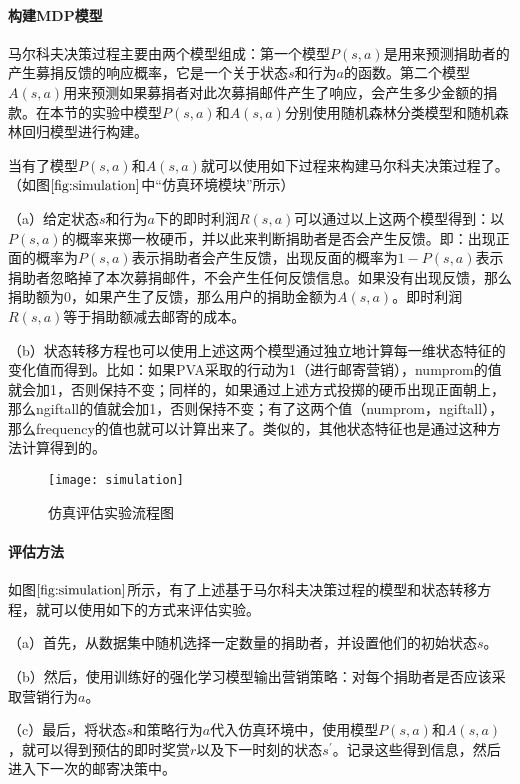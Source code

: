 \paragraph{构建MDP模型}
马尔科夫决策过程主要由两个模型组成：第一个模型$P(s,a)$是用来预测捐助者的产生募捐反馈的响应概率，它是一个关于状态$s$和行为$a$的函数。第二个模型$A(s,a)$用来预测如果募捐者对此次募捐邮件产生了响应，会产生多少金额的捐款。在本节的实验中模型$P(s,a)$和$A(s,a)$分别使用随机森林分类模型和随机森林回归模型进行构建。

当有了模型$P(s,a)$和$A(s,a)$就可以使用如下过程来构建马尔科夫决策过程了。（如图$\ref{fig:simulation}$中“仿真环境模块”所示）

（a）给定状态$s$和行为$a$下的即时利润$R(s,a)$可以通过以上这两个模型得到：以$P(s,a)$的概率来掷一枚硬币，并以此来判断捐助者是否会产生反馈。即：出现正面的概率为$P(s,a)$表示捐助者会产生反馈，出现反面的概率为$1-P(s,a)$表示捐助者忽略掉了本次募捐邮件，不会产生任何反馈信息。如果没有出现反馈，那么捐助额为$0$，如果产生了反馈，那么用户的捐助金额为$A(s,a)$。即时利润$R(s,a)$等于捐助额减去邮寄的成本。

（b）状态转移方程也可以使用上述这两个模型通过独立地计算每一维状态特征的变化值而得到。比如：如果PVA采取的行动为1（进行邮寄营销），numprom的值就会加1，否则保持不变；同样的，如果通过上述方式投掷的硬币出现正面朝上，那么ngiftall的值就会加1，否则保持不变；有了这两个值（numprom，ngiftall），那么frequency的值也就可以计算出来了。类似的，其他状态特征也是通过这种方法计算得到的。

\begin{figure}[htbp]
\centering
\texttt{[image: simulation]}
\caption{仿真评估实验流程图}
\label{fig:simulation}
\end{figure}

\paragraph{评估方法}
如图$\ref{fig:simulation}$所示，有了上述基于马尔科夫决策过程的模型和状态转移方程，就可以使用如下的方式来评估实验。

（a）首先，从数据集中随机选择一定数量的捐助者，并设置他们的初始状态$s$。

（b）然后，使用训练好的强化学习模型输出营销策略：对每个捐助者是否应该采取营销行为$a$。

（c）最后，将状态$s$和策略行为$a$代入仿真环境中，使用模型$P(s,a)$和$A(s,a)$，就可以得到预估的即时奖赏$r$以及下一时刻的状态$s^{'}$。记录这些得到信息，然后进入下一次的邮寄决策中。

